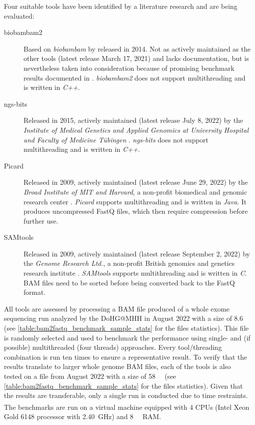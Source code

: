 Four suitable tools have been identified by a literature research and are being evaluated:
\begin{description}
    \item[biobambam2] Based on \textit{biobambam} by \citeauthor{Tischler2014} released in 2014. Not as actively maintained as the other tools (latest release March 17, 2021) and lacks documentation, but is nevertheless taken into consideration because of promising benchmark results documented in \autocite{Tischler2014}. \textit{biobambam2} does not support multithreading and is written in \textit{C++}.
    \item[ngs-bits] Released in 2015, actively maintained (latest release July 8, 2022) by the \textit{Institute of Medical Genetics and Applied Genomics at University Hospital and Faculty of Medicine T\"ubingen} \autocite{Sturm2018}. \textit{ngs-bits} does not support multithreading and is written in \textit{C++}.
    \item[Picard] Released in 2009, actively maintained (latest release June 29, 2022) by the \textit{Broad Institute of MIT and Harvard}, a non-profit biomedical and genomic research center \autocite{BroadInstitute2019}. \textit{Picard} supports multithreading and is written in \textit{Java}. It produces uncompressed FastQ files, which then require compression before further use.
    \item[SAMtools] Released in 2009, actively maintained (latest release September 2, 2022) by the \textit{Genome Research Ltd.}, a non-profit British genomics and genetics research institute \autocite{Danecek2021}. \textit{SAMtools} supports multithreading and is written in \textit{C}. BAM files need to be sorted before being converted back to the FastQ format.
\end{description}

All tools are assessed by processing a BAM file produced of a whole exome sequencing run analyzed by the \ac{DoHG@MHH} in August 2022 with a size of \SI{8.6}{\giga\byte} (see \cref{table:bam2fastq_benchmark_sample_stats} for the files statistics). This file is randomly selected and used to benchmark the performance using single- and (if possible) multithreaded (four threads) approaches. Every tool/threading combination is run ten times to ensure a representative result. To verify that the results translate to larger whole genome BAM files, each of the tools is also tested on a file from August 2022 with a size of \SI{58}{\giga\byte} (see \cref{table:bam2fastq_benchmark_sample_stats} for the files statistics). Given that the results are transferable, only a single run is conducted due to time restraints. The benchmarks are run on a virtual machine equipped with 4 CPUs (Intel\textsuperscript{\textregistered} Xeon\textsuperscript{\textregistered} Gold 6148 processor with \SI{2.40}{\giga\hertz}) and \SI{8}{\giga\byte} RAM. 

